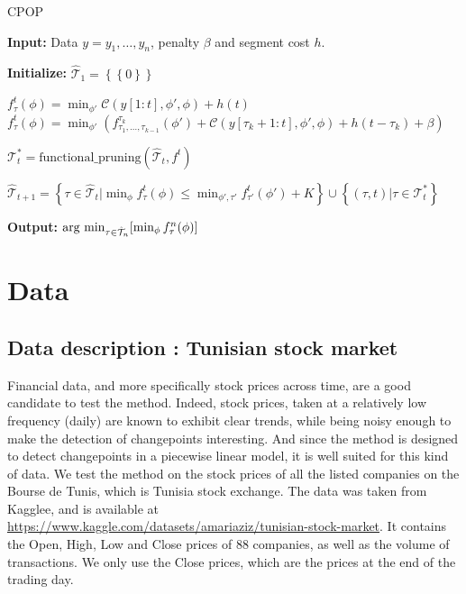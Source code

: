 \documentclass[11pt]{article}
\begin{document}
\begin{algorithm}[H]
    \caption{CPOP}
    \begin{algorithmic}[1]
        \State \textbf{Input:} Data $y=y_1,\dots,y_n$, penalty $\beta$ and segment cost $h$.

        \State \textbf{Initialize:} $\hat{\mathcal{T}}_1=\left\{\left\{0\right\}\right\}$

         
        \If {$\tau = \left\{0\right\}$}
        \State $f^t_{\tau}(\phi)=\min_{\phi'}\mathcal{C}(y[1:t],\phi',\phi)+h(t)$
        \Else {}
        \State $f^t_{\tau}(\phi)=\min_{\phi'}\left(f^{\tau_k}_{\tau_1,\dots,\tau_{k-1}}(\phi')+\mathcal{C}(y[\tau_k+1:t],\phi',\phi)+h(t-\tau_k)+\beta\right)$
        \EndIf
        \EndFor

        \State $\mathcal{T}^*_t = \text{functional\_pruning}(\hat{\mathcal{T}}_t, f^t)$

        \State $\hat{\mathcal{T}}_{t+1}= \left\{\tau\in \hat{\mathcal{T}}_t \big| \min_\phi f_\tau^t(\phi)\leq \min_{\phi',\tau'}f_{\tau'}^t(\phi')+K\right\}\cup \left\{(\tau, t)\big|\tau\in \mathcal{T}^*_t\right\}$
        \EndFor

        \State \textbf{Output:} $\operatorname*{\mbox{arg min}}_{\tau\in \hat{\mathcal{T}}_n}[\min_\phi f^n_\tau(\phi)]$
    \end{algorithmic}
\end{algorithm}

\section{Data}
\subsection{Data description : Tunisian stock market}
Financial data, and more specifically stock prices across time, are a good candidate to test the method. Indeed, stock prices, taken at a relatively low frequency (daily) are known to exhibit clear trends, while being noisy enough to make the detection of changepoints interesting. And since the method is designed to detect changepoints in a piecewise linear model, it is well suited for this kind of data.
\jump
We test the method on the stock prices of all the listed companies on the Bourse de Tunis, which is Tunisia stock exchange. The data was taken from Kagglee, and is available at \url{https://www.kaggle.com/datasets/amariaziz/tunisian-stock-market}. It contains the Open, High, Low and Close prices of 88 companies, as well as the volume of transactions. We only use the Close prices, which are the prices at the end of the trading day.
\end{document}
